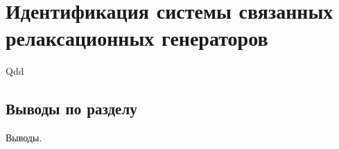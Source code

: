\chapter{Идентификация системы связанных релаксационных генераторов}

Qdd

\cite{mishenko_du_small_relax}

\section{Выводы по разделу \thechapter}

Выводы.

